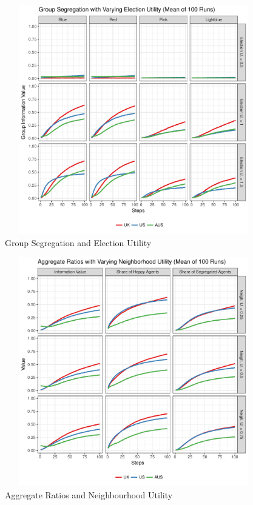 \documentclass[12pt, a4paper]{article}
\begin{document}
\begin{figure}[bp!]
	\centering
	\caption{Group Segregation and Election Utility}
	\includegraphics[height=10cm,width=16cm]{./Plots/all_el_grp_ratios.pdf}
\end{figure}

\begin{figure}[bp!]
	\centering
	\caption{Aggregate Ratios and Neighbourhood Utility}
	\includegraphics[height=10cm,width=16cm]{./Plots/all_nb_agg_ratios.pdf}
\end{figure}
\end{document}
